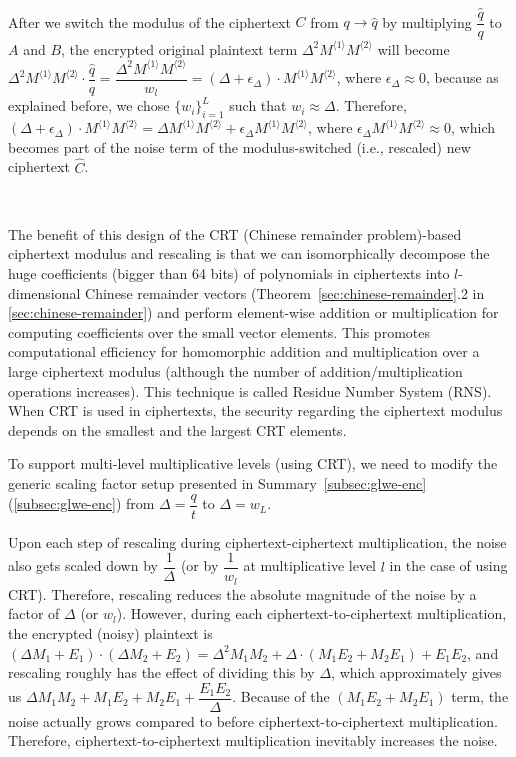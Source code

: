 $ $

After we switch the modulus of the ciphertext $C$ from $q \rightarrow \hat{q}$ by multiplying $\dfrac{\hat{q}}{q}$ to $A$ and $B$, the encrypted original plaintext term $\Delta^2 M^{\langle 1 \rangle} M^{\langle 2 \rangle}$ will become $\Delta^2 M^{\langle 1 \rangle} M^{\langle 2 \rangle} \cdot \dfrac{\hat{q}}{q} = \dfrac{\Delta^2 M^{\langle 1 \rangle} M^{\langle 2 \rangle}}{w_l} = (\Delta + \epsilon_\Delta)\cdot M^{\langle 1 \rangle} M^{\langle 2 \rangle}$, where $\epsilon_\Delta \approx 0$, because as explained before, we chose $\{w_i\}_{i=1}^{L}$ such that $w_i \approx \Delta$. Therefore, $(\Delta + \epsilon_\Delta)\cdot M^{\langle 1 \rangle} M^{\langle 2 \rangle} = \Delta M^{\langle 1 \rangle} M^{\langle 2 \rangle} + \epsilon_\Delta M^{\langle 1 \rangle} M^{\langle 2 \rangle}$, where $\epsilon_\Delta M^{\langle 1 \rangle} M^{\langle 2 \rangle} \approx 0$, which becomes part of the noise term of the modulus-switched (i.e., rescaled) new ciphertext $\hat{C}$. 

$ $

The benefit of this design of the CRT (Chinese remainder problem)-based ciphertext modulus and rescaling is that we can isomorphically decompose the huge coefficients (bigger than 64 bits) of polynomials in ciphertexts into $l$-dimensional Chinese remainder vectors (Theorem~\ref{sec:chinese-remainder}.2 in \autoref{sec:chinese-remainder}) and perform element-wise addition or multiplication for computing coefficients over the small vector elements. This promotes computational efficiency for homomorphic addition and multiplication over a large ciphertext modulus (although the number of addition/multiplication operations increases). This technique is called Residue Number System (RNS). When CRT is used in ciphertexts, the security regarding the ciphertext modulus depends on the smallest and the largest CRT elements. 

 To support multi-level multiplicative levels (using CRT), we need to modify the generic scaling factor setup presented in Summary~\ref*{subsec:glwe-enc} (\autoref{subsec:glwe-enc}) from $\Delta = \dfrac{q}{t}$ to $\Delta = w_L$. 

 Upon each step of rescaling during ciphertext-ciphertext multiplication, the noise also gets scaled down by $\dfrac{1}{\Delta}$ (or by $\dfrac{1}{w_l}$ at multiplicative level $l$ in the case of using CRT). 
Therefore, rescaling reduces the absolute magnitude of the noise by a factor of $\Delta$ (or $w_l$). However, during each ciphertext-to-ciphertext multiplication, the encrypted (noisy) plaintext is $(\Delta M_1 + E_1)\cdot(\Delta M_2 + E_2) = \Delta^2 M_1 M_2 + \Delta\cdot (M_1E_2 + M_2E_1) + E_1E_2$, and rescaling roughly has the effect of dividing this by $\Delta$, which approximately gives us $\Delta M_1 M_2 + M_1E_2 + M_2E_1 + \dfrac{E_1E_2}{\Delta}$. Because of the $(M_1E_2 + M_2E_1)$ term, the noise actually grows compared to before ciphertext-to-ciphertext multiplication. Therefore, ciphertext-to-ciphertext multiplication inevitably increases the noise. 

